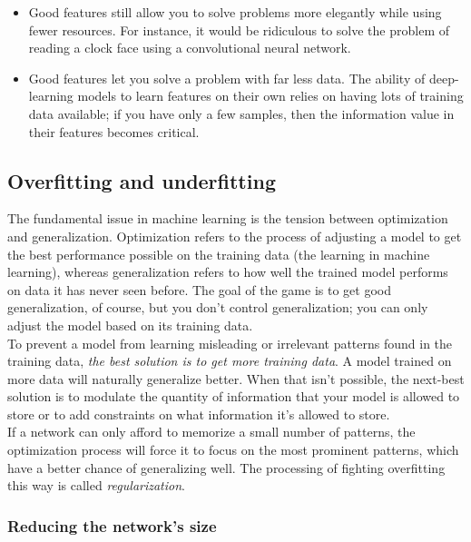 \documentclass{article}
\numberwithin{equation}{section} %
\begin{document}
\begin{itemize}
	\item Good features still allow you to solve problems more elegantly while using fewer resources. For instance, it would be ridiculous to solve the problem of reading a clock face using a convolutional neural network.
	\item Good features let you solve a problem with far less data. The ability of deep-learning models to learn features on their own relies on having lots of training data available; if you have only a few samples, then the information value in their features becomes critical.
\end{itemize}


\subsection{ Overfitting and underfitting}

The fundamental issue in machine learning is the tension between optimization and generalization. Optimization refers to the process of adjusting a model to get the
best performance possible on the training data (the learning in machine learning),
whereas generalization refers to how well the trained model performs on data it has
never seen before. The goal of the game is to get good generalization, of course, but you don’t control generalization; you can only adjust the model based on its training data. \\

To prevent a model from learning misleading or irrelevant patterns found in the
training data, \textit{the best solution is to get more training data}. A model trained on more data will naturally generalize better. When that isn’t possible, the next-best solution is to modulate the quantity of information that your model is allowed to store or to add constraints on what information it’s allowed to store. \\

If a network can only afford to memorize a small number of patterns, the optimization process will force it to focus on the most prominent patterns, which have a better chance of generalizing well. The processing of fighting overfitting this way is called \textit{regularization}. \\

\subsubsection{Reducing the network’s size}
\end{document}
